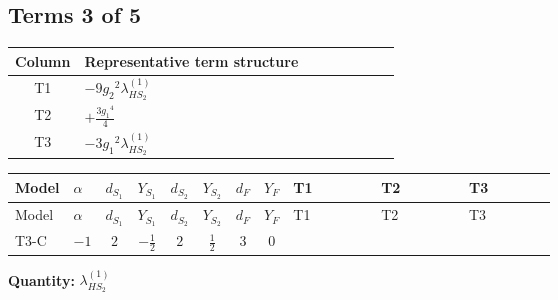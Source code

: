 \documentclass[8pt]{article}
\begin{document}
\begin{landscape}
\subsection*{Terms 3 of 5}
\begin{center}
\begin{tabular}{@{}c >{\raggedright\arraybackslash}p{0.82\linewidth}@{}}
\toprule
Column & Representative term structure \\
\midrule
T1 & \(\displaystyle -9 {g_2}^2 {\lambda_{HS_2}^{(1)}}\) \\
\midrule
T2 & \(\displaystyle +\frac{3 {g_1}^4}{4}\) \\
\midrule
T3 & \(\displaystyle -3 {g_1}^2 {\lambda_{HS_2}^{(1)}}\) \\
\midrule
\bottomrule
\end{tabular}
\end{center}
\smallskip
\tiny
\begin{longtable}{@{}llcccccc >{\raggedright\arraybackslash}p{0.21\linewidth} >{\raggedright\arraybackslash}p{0.21\linewidth} >{\raggedright\arraybackslash}p{0.21\linewidth}@{}}
\toprule
Model & $\alpha$ & $d_{S_1}$ & $Y_{S_1}$ & $d_{S_2}$ & $Y_{S_2}$ & $d_F$ & $Y_F$ & T1 & T2 & T3 \\
\midrule
\endfirsthead
\toprule
Model & $\alpha$ & $d_{S_1}$ & $Y_{S_1}$ & $d_{S_2}$ & $Y_{S_2}$ & $d_F$ & $Y_F$ & T1 & T2 & T3 \\
\midrule
\endhead
T3-C & $-1$ & $2$ & $-\frac{1}{2}$ & $2$ & $\frac{1}{2}$ & $3$ & $0$ & \scriptsize\adjustbox{max width=\linewidth}{$\begin{gathered} -9 {g_2}^2 {\lambda_{HS_2}^{(1)}}\end{gathered}$} & \scriptsize\adjustbox{max width=\linewidth}{$\begin{gathered} +\frac{3 {g_1}^4}{4}\end{gathered}$} & \scriptsize\adjustbox{max width=\linewidth}{$\begin{gathered} -3 {g_1}^2 {\lambda_{HS_2}^{(1)}}\end{gathered}$} \\
\midrule
\bottomrule
\end{longtable}
\clearpage
\noindent\textbf{Quantity: }$\lambda_{HS_2}^{(1)}$\par\smallskip

\end{landscape}
\end{document}
